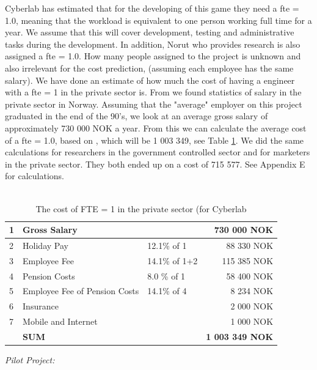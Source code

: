 Cyberlab has estimated that for the developing of this game they need a \ac{fte} = 1.0, meaning that the workload is equivalent to one person working full time for a year. We assume that this will cover development, testing and administrative tasks during the development. In addition, Norut who provides research is also assigned a \ac{fte} = 1.0. How many people assigned to the project is unknown and also irrelevant for the cost prediction, (assuming each employee has the same salary). We have done an estimate of how much the cost of having a engineer with a \ac{fte} = 1 in the private sector is. From \cite{tekna} we found statistics of salary in the private sector in Norway. Assuming that the "average" employer on this project graduated in the end of the 90's, we look at an average gross salary of approximately 730 000 NOK a year. From this we can calculate the average cost of a \ac{fte} = 1.0, based on \cite{altinn}, which will be 1 003 349, see Table \ref{tab:costofFTE}. We did the same calculations for researchers in the government controlled sector and for marketers in the private sector. They both ended up on a cost of 715 577. See Appendix E for calculations.\\ \\
\begin{table}
\centering
    \begin{tabular}{|l|l|l|r|}
        \hline
       1&Gross Salary & & 730 000 NOK \\ \hline
       2&Holiday Pay & 12.1\% of 1  & 88 330 NOK \\ \hline
	   3&Employee Fee & 14.1\% of 1+2  & 115 385 NOK \\ \hline
	   4&Pension Costs & 8.0 \% of 1 & 58 400 NOK\\ \hline
	   5&Employee Fee of Pension Costs & 14.1\% of 4 & 8 234 NOK \\ \hline
	   6&Insurance & & 2 000 NOK \\ \hline
	   7&Mobile and Internet & & 1 000 NOK \\ \hline
	   & \textbf{SUM} & & \textbf{1 003 349 NOK} \\
	    \hline
    \end{tabular}
    \caption[Cost of FTE = 1]{The cost of FTE = 1 in the private sector (for Cyberlab}
    \label{tab:costofFTE}
\end{table}
\emph{Pilot Project:}\\
